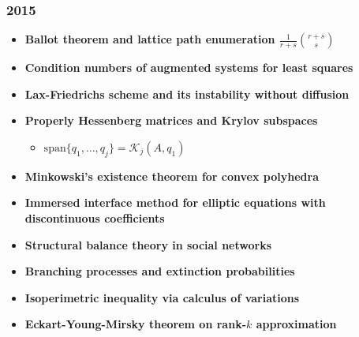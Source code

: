 \subsubsection*{2015}
\begin{itemize}
    \item \textbf{Ballot theorem and lattice path enumeration $\frac{1}{r+s}\binom{r+s}{s}$}
    \item \textbf{Condition numbers of augmented systems for least squares}
    \item \textbf{Lax-Friedrichs scheme and its instability without diffusion}
    \item \textbf{Properly Hessenberg matrices and Krylov subspaces}
        \begin{itemize}
            \item $\mathrm{span}\{q_1, \dots, q_j\} = \mathcal{K}_j(A, q_1)$
        \end{itemize}
    \item \textbf{Minkowski's existence theorem for convex polyhedra}
    \item \textbf{Immersed interface method for elliptic equations with discontinuous coefficients}
    \item \textbf{Structural balance theory in social networks}
    \item \textbf{Branching processes and extinction probabilities}
    \item \textbf{Isoperimetric inequality via calculus of variations}
    \item \textbf{Eckart-Young-Mirsky theorem on rank-$k$ approximation}
\end{itemize}

